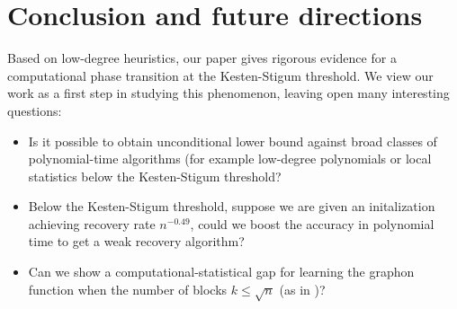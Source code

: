 \section{Conclusion and future directions}
Based on low-degree heuristics, our paper gives rigorous evidence for a computational phase transition at the Kesten-Stigum threshold. 
We view our work as a first step in studying this phenomenon, leaving open many interesting questions:
\begin{itemize}
    \item Is it possible to obtain unconditional lower bound against broad classes of polynomial-time algorithms (for example low-degree polynomials or local statistics \cite{banks2021local,ding2022robust} below the Kesten-Stigum threshold?
    \item Below the Kesten-Stigum threshold, suppose we are given an initalization achieving recovery rate $n^{-0.49}$, could we boost the accuracy in polynomial time to get a weak recovery algorithm?
    \item Can we show a computational-statistical gap for learning the graphon function when the number of blocks $k\leq \sqrt{n}$ (as in \cite{luo2023computational})?
\end{itemize}